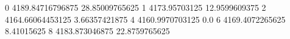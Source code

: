 0 4189.84716796875 28.85009765625
1 4173.95703125 12.9599609375
2 4164.66064453125 3.66357421875
4 4160.9970703125 0.0
6 4169.4072265625 8.41015625
8 4183.873046875 22.8759765625
